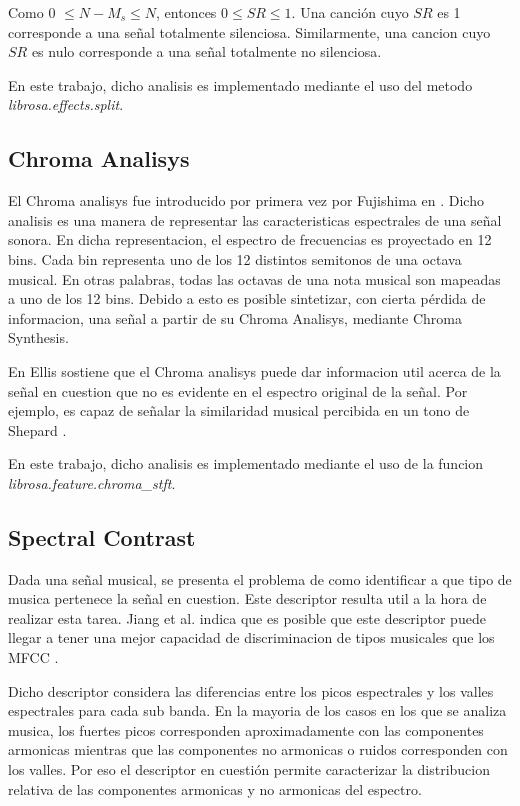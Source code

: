 \documentclass[]{article}
\begin{document}
\begin{multicols}{2}
Como  0 $\leq N-M_s\leq N$, entonces $0 \leq SR \leq 1$.
Una canción cuyo $SR$ es 1 corresponde a una señal totalmente silenciosa.
Similarmente, una cancion cuyo $SR$ es nulo corresponde a una señal totalmente
no silenciosa.

En este trabajo, dicho analisis es implementado mediante el uso del metodo
\emph{{librosa.effects.split}}.

\subsection{Chroma Analisys}
\label{Sec:Chroma}
El Chroma analisys fue introducido por primera vez por Fujishima en \cite{fujishima1999realtime}.
Dicho analisis es una manera de representar las caracteristicas espectrales
de una señal sonora. En dicha representacion, el espectro de frecuencias es
proyectado en 12 bins. Cada bin representa uno de los 12 distintos semitonos
de una octava musical. En otras palabras, todas las octavas de una nota musical
son mapeadas a uno de los 12 bins. Debido a esto es posible sintetizar, con cierta
pérdida de informacion, una señal a partir de su Chroma Analisys, mediante Chroma
Synthesis.

En \cite{Ellis} Ellis sostiene que el Chroma analisys puede dar informacion
util acerca de la señal en cuestion que no es evidente en el espectro original de
la señal. Por ejemplo, es capaz de señalar la similaridad musical percibida en
un tono de Shepard \cite{bello}.

En este trabajo, dicho analisis es implementado mediante el uso de la funcion \emph{{librosa.feature.chroma\_stft}}.
\subsection{Spectral Contrast}
Dada una señal musical, se presenta el problema de como identificar a que tipo de
musica pertenece la señal en cuestion. Este descriptor resulta util a la hora de
realizar esta tarea. Jiang et al. indica que es posible que este descriptor puede llegar
a tener una mejor capacidad de discriminacion de tipos musicales que los MFCC
\cite{DanNingJiang}.

Dicho descriptor considera las diferencias entre los picos espectrales y los valles
espectrales para cada sub banda. En la mayoria de los casos en los que se analiza
musica, los fuertes picos corresponden aproximadamente con las componentes armonicas
mientras que las componentes no armonicas o ruidos corresponden con los valles.
Por eso el descriptor en cuestión permite caracterizar la distribucion relativa
de las componentes armonicas y no armonicas del espectro.


\end{multicols}
\end{document}
